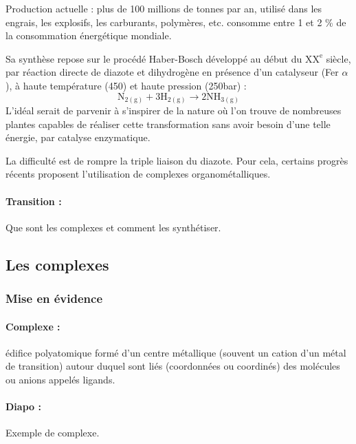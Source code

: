 Production actuelle : plus de 100 millions de tonnes par an, utilisé dans les engrais, les explosifs, les carburants, polymères, etc. consomme entre 1 et 2 \% de la consommation énergétique mondiale.

Sa synthèse repose sur le procédé Haber-Bosch développé au début du $\mathrm{XX^e}$ siècle, par réaction directe de diazote et dihydrogène en présence d'un catalyseur (Fer $\alpha$), à haute température (\unit{450}{\celsius}) et haute pression (\unit{250}{bar}) :
\begin{equation*}
\mathrm{N_{2(g)}} + 3\mathrm{H_{2(g)}} \rightarrow 2\mathrm{NH_{3(g)}}
\end{equation*}
L'idéal serait de parvenir à s'inspirer de la nature où l'on trouve de nombreuses plantes capables de réaliser cette transformation sans avoir besoin d'une telle énergie, par catalyse enzymatique.

La difficulté est de rompre la triple liaison du diazote. 
Pour cela, certains progrès récents proposent l'utilisation de complexes organométalliques.

\paragraph{Transition : } Que sont les complexes et comment les synthétiser.

\subsection{Les complexes}

\subsubsection{Mise en évidence}

\paragraph{Complexe : } édifice polyatomique formé d'un centre métallique (souvent un cation d'un métal de transition) autour duquel sont liés (coordonnées ou coordinés) des molécules ou anions appelés ligands.

\paragraph{Diapo :} Exemple de complexe.

